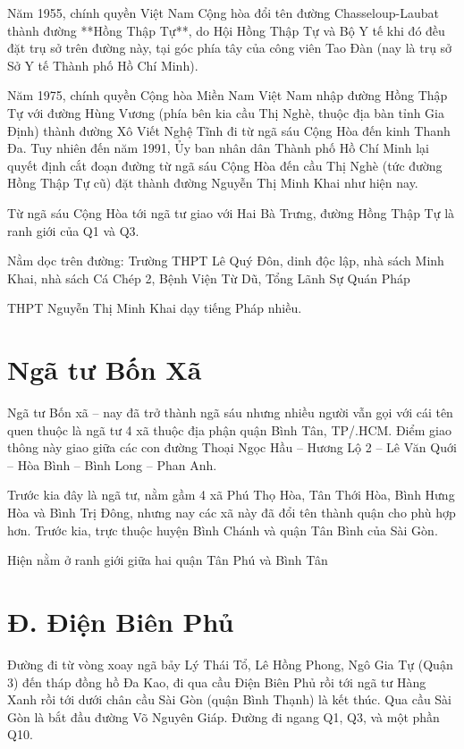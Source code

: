 Năm 1955, chính quyền Việt Nam Cộng hòa đổi tên đường Chasseloup-Laubat thành đường **Hồng Thập Tự**, do Hội Hồng Thập Tự và Bộ Y tế khi đó đều đặt trụ sở trên đường này, tại góc phía tây của công viên Tao Đàn (nay là trụ sở Sở Y tế Thành phố Hồ Chí Minh).

Năm 1975, chính quyền Cộng hòa Miền Nam Việt Nam nhập đường Hồng Thập Tự với đường Hùng Vương (phía bên kia cầu Thị Nghè, thuộc địa bàn tỉnh Gia Định) thành đường Xô Viết Nghệ Tĩnh đi từ ngã sáu Cộng Hòa đến kinh Thanh Đa. Tuy nhiên đến năm 1991, Ủy ban nhân dân Thành phố Hồ Chí Minh lại quyết định cắt đoạn đường từ ngã sáu Cộng Hòa đến cầu Thị Nghè (tức đường Hồng Thập Tự cũ) đặt thành đường Nguyễn Thị Minh Khai như hiện nay.

Từ ngã sáu Cộng Hòa tới ngã tư giao với Hai Bà Trưng, đường Hồng Thập Tự là ranh giới của Q1 và Q3.

Nằm dọc trên đường: Trường THPT Lê Quý Đôn, dinh độc lập, nhà sách Minh Khai, nhà sách Cá Chép 2, Bệnh Viện Từ Dũ, Tổng Lãnh Sự Quán Pháp

THPT Nguyễn Thị Minh Khai dạy tiếng Pháp nhiều.

\section{Ngã tư Bốn Xã}

Ngã tư Bốn xã – nay đã trở thành ngã sáu nhưng nhiều người vẫn gọi với cái tên quen thuộc là ngã tư 4 xã thuộc địa phận quận Bình Tân, TP/.HCM. Điểm giao thông này giao giữa các con đường Thoại Ngọc Hầu – Hương Lộ 2 – Lê Văn Quới – Hòa Bình – Bình Long – Phan Anh.

Trước kia đây là ngã tư, nằm gầm 4 xã Phú Thọ Hòa, Tân Thới Hòa, Bình Hưng Hòa và Bình Trị Đông, nhưng nay các xã này đã đổi tên thành quận cho phù hợp hơn. Trước kia, trực thuộc huyện Bình Chánh và quận Tân Bình của Sài Gòn.

Hiện nằm ở ranh giới giữa hai quận Tân Phú và Bình Tân

\section{Đ. Điện Biên Phủ}

Đường đi từ vòng xoay ngã bảy Lý Thái Tổ, Lê Hồng Phong, Ngô Gia Tự (Quận 3) đến tháp đồng hồ Đa Kao, đi qua cầu Điện Biên Phủ rồi tới ngã tư Hàng Xanh rồi tới dưới chân cầu Sài Gòn (quận Bình Thạnh) là kết thúc. Qua cầu Sài Gòn là bắt đầu đường Võ Nguyên Giáp. Đường đi ngang Q1, Q3, và một phần Q10.

